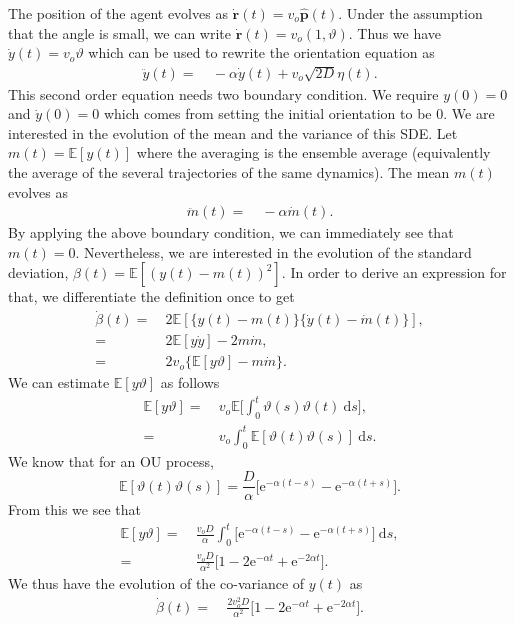 \documentclass[%
reprint,
superscriptaddress,
floatfix,
amsmath,
amssymb,
aps,
notitlepage
]{revtex4-1}
\def\d{\text{d}}
\def\e{\text{e}}
\def\r{\mathbf{r}}
\def\E{\mathbb{E}}
\def\ph{\hat{\mathbf{p}}}
\def\yd{\dot{y}}
\def\theta{\vartheta}
\begin{document}
The position of the agent evolves as $\dot{\r}(t) = v_o \ph(t)$. Under the assumption that the angle
is small, we can write $\dot{\r}(t) = v_o (1, \theta)$. Thus we have $\yd (t) = v_o \theta$ which can
be used to rewrite the orientation equation as
\begin{align}
    \ddot{y}(t) =& \ - \alpha \yd (t) + v_o\sqrt{2 D} \eta(t).
\end{align}
This second order equation needs two boundary condition. We require $y(0) = 0$ and $\yd (0) = 0$ which
comes from setting the initial orientation to be 0. We are interested in the evolution of the mean and
the variance of this SDE. Let $m(t)= \E [  y(t) ]$ where the averaging is the ensemble average
(equivalently the average of the several trajectories of the same dynamics). The mean $m(t)$ evolves as
\begin{align}
    \ddot{m}(t) =& \ -\alpha \dot{m}(t).
\end{align}
By applying the above boundary condition, we can immediately see that $m(t) = 0$. Nevertheless, we are
interested in the evolution of the standard deviation, $\beta(t) = \E [  {(y(t) - m(t))}^2 ]$.
In order to derive an expression for that, we differentiate the definition once to get
\begin{align*}
    \dot{\beta}(t) =& \ 2 \E [ \{ y(t) - m(t) \} \{ \yd(t) - \dot{m}(t) \} ], \\
    = & \ 2 \E [ y \yd ] - 2 m \dot{m}, \\
    = & \ 2 v_o \{ \E [ y \theta ] - m \dot{m}\}.
\end{align*}
We can estimate $\E [ y \theta ]$ as follows
\begin{align*}
    \E [ y \theta ] =& \ v_o \E \bigg[ \int_0^t \theta(s) \theta(t) \ \d s \bigg], \\
    =& \ v_o  \int_0^t \E [ \theta(t) \theta(s) ] \ \d s.
\end{align*}
We know that for an OU process, 
\[
    \E [ \theta(t) \theta(s) ] = \frac{D}{\alpha} \bigg[ \e^{-\alpha(t-s)}-\e^{-\alpha(t+s)} \bigg].
\]
From this we see that
\begin{align*}
    \E [ y \theta ] =& \ \frac{v_o D}{\alpha} \int_0^t  \bigg[ \e^{-\alpha(t-s)}-\e^{-\alpha(t+s)} \bigg] \ \d s, \\
    =& \ \frac{v_o D}{\alpha^2} \bigg[ 1 - 2 \e^{-\alpha t} + \e^{-2 \alpha t}\bigg].
\end{align*}
We thus have the evolution of the co-variance of $y(t)$ as
\begin{align}
    \dot{\beta}(t) = & \  \frac{2 v_o^2 D}{\alpha^2} \bigg[ 1 - 2 \e^{-\alpha t} + \e^{-2 \alpha t}\bigg].
\end{align}
\end{document}
